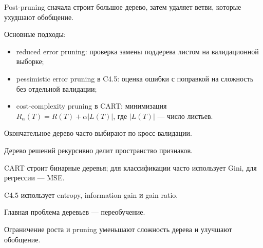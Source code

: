 Post-pruning сначала строит большое дерево, затем удаляет ветви, которые ухудшают обобщение.

Основные подходы:
\begin{itemize}
    \item reduced error pruning: проверка замены поддерева листом на валидационной выборке;
    \item pessimistic error pruning в C4.5: оценка ошибки с поправкой на сложность без отдельной валидации;
    \item cost-complexity pruning в CART: минимизация $R_\alpha(T)=R(T)+\alpha |L(T)|$, где $|L(T)|$ --- число листьев.
\end{itemize}

Окончательное дерево часто выбирают по кросс-валидации.

\begin{important}
    \item Дерево решений рекурсивно делит пространство признаков.
    \item CART строит бинарные деревья; для классификации часто использует Gini, для регрессии --- MSE.
    \item C4.5 использует entropy, information gain и gain ratio.
    \item Главная проблема деревьев --- переобучение.
    \item Ограничение роста и pruning уменьшают сложность дерева и улучшают обобщение.
\end{important}
